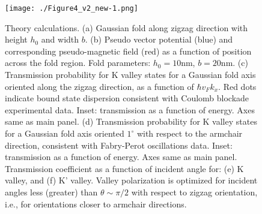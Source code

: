 \documentclass[journal=jacsat,manuscript=article]{achemso}
\begin{document}
\begin{figure}
\begin{center}
\texttt{[image: ./Figure4\_v2\_new-1.png]}
\end{center}
\caption{{ Theory calculations.} ({a}) Gaussian fold along zigzag direction with height $h_{0}$ and width $b$. ({b}) Pseudo vector potential (blue) and corresponding pseudo-magnetic field (red) as a function of position across the fold region. Fold parameters: $h_0 = 10$nm, $b = 20$nm. ({c}) Transmission probability for K valley states for a Gaussian fold axis oriented along the zigzag direction, as a function of $\hbar v_F k_x$. Red dots indicate bound state dispersion consistent with Coulomb blockade experimental data. Inset: transmission as a function of energy. Axes same as main panel. ({d}) Transmission probability for K valley states for a Gaussian fold axis oriented $1^\circ$ with respect to the armchair direction, consistent with Fabry-Perot oscillations data. Inset: transmission as a function of energy. Axes same as main panel. Transmission coefficient as a function of incident angle for: ({e}) K valley, and ({f}) K' valley. Valley polarization is optimized for incident angles less (greater) than $\theta \sim \pi/2$ with respect to zigzag orientation, i.e., for orientations closer to armchair directions.}
\label{4}
\end{figure}
\end{document}
